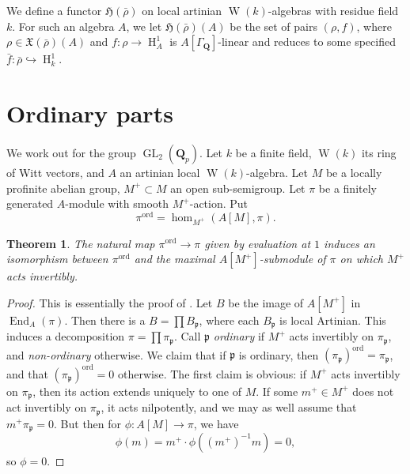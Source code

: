 \documentclass{article}
\DeclareMathOperator{\End}{End}
\DeclareMathOperator{\GL}{GL}
\DeclareMathOperator{\h}{H}
\DeclareMathOperator{\witt}{W}
\newcommand{\dQ}{\mathbf{Q}}
\newcommand{\fH}{\mathfrak{H}}
\newcommand{\fp}{\mathfrak{p}}
\newcommand{\fX}{\mathfrak{X}}
\newcommand{\ordinary}{\mathrm{ord}}
\newtheorem{theorem}[subsection]{Theorem}
\begin{document}
We define a functor  
$\fH(\bar\rho)$ on local artinian $\witt(k)$-algebras with residue field $k$. 
For such an algebra $A$, we let $\fH(\bar\rho)(A)$ be the set of pairs 
$(\rho,f)$, where $\rho\in \fX(\bar\rho)(A)$ and $f:\rho\to \h^1_A$ is 
$A[\Gamma_\dQ]$-linear and reduces to some specified 
$\bar f:\bar\rho\hookrightarrow \h_k^1$. 





\section{Ordinary parts}

We work out \cite{emerton-2010-i,emerton-2010-ii} for the group $\GL_2(\dQ_p)$. 
Let $k$ be a finite field, $\witt(k)$ its ring of Witt vectors, and $A$ an 
artinian local $\witt(k)$-algebra. Let $M$ be a locally profinite abelian 
group, $M^+\subset M$ an open sub-semigroup. Let $\pi$ be a finitely generated 
$A$-module with smooth $M^+$-action. Put 
\[
  \pi^\ordinary = \hom_{M^+}(A[M],\pi) .
\]

\begin{theorem}
The natural map $\pi^\ordinary\to \pi$ given by evaluation at $1$ induces an 
isomorphism between $\pi^\ordinary$ and the maximal $A[M^+]$-submodule of 
$\pi$ on which $M^+$ acts invertibly. 
\end{theorem}
\begin{proof}
This is essentially the proof of \cite[3.1.5]{emerton-2010-i}. 
Let $B$ be the image of $A[M^+]$ in $\End_A(\pi)$. Then there is a 
$B=\prod B_\fp$, where each $B_\fp$ is local Artinian. This induces a 
decomposition $\pi=\prod \pi_\fp$. Call $\fp$ \emph{ordinary} if 
$M^+$ acts invertibly on $\pi_\fp$, and \emph{non-ordinary} otherwise. We claim 
that if $\fp$ is ordinary, then $(\pi_\fp)^\ordinary=\pi_\fp$, and that 
$(\pi_\fp)^\ordinary=0$ otherwise. The first claim is obvious: if 
$M^+$ acts invertibly on $\pi_\fp$, then its action extends uniquely to one of 
$M$. If some $m^+\in M^+$ does not act invertibly on $\pi_\fp$, it acts 
nilpotently, and we may as well assume that $m^+ \pi_\fp=0$. But then for 
$\phi:A[M]\to \pi$, we have 
\[
  \phi(m) = m^+\cdot \phi\left((m^+)^{-1} m\right) = 0,
\]
so $\phi=0$. 
\end{proof}
\end{document}

